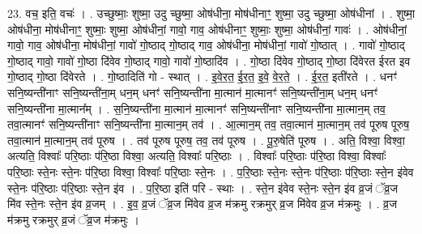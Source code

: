 \documentclass[17pt]{extarticle}
\begin{document}
23. वच॒ इति॒ वचः॑ । . उच्छुष्माः॒ शुष्मा॒ उदु च्छुष्मा॒ ओष॑धीना॒ मोष॑धीनाꣳ॒॒ शुष्मा॒ उदु च्छुष्मा॒ ओष॑धीनां । . शुष्मा॒ ओष॑धीना॒ मोष॑धीनाꣳ॒॒ शुष्माः॒ शुष्मा॒ ओष॑धीनां॒ गावो॒ गाव॒ ओष॑धीनाꣳ॒॒ शुष्माः॒ शुष्मा॒ ओष॑धीनां॒ गावः॑ । . ओष॑धीनां॒ गावो॒ गाव॒ ओष॑धीना॒ मोष॑धीनां॒ गावो॑ गो॒ष्ठाद् गो॒ष्ठाद् गाव॒ ओष॑धीना॒ मोष॑धीनां॒ गावो॑ गो॒ष्ठात् । . गावो॑ गो॒ष्ठाद् गो॒ष्ठाद् गावो॒ गावो॑ गो॒ष्ठा दि॑वेव गो॒ष्ठाद् गावो॒ गावो॑ गो॒ष्ठादि॑व । . गो॒ष्ठा दि॑वेव गो॒ष्ठाद् गो॒ष्ठा दि॑वेरत ईरत इव गो॒ष्ठाद् गो॒ष्ठा दि॑वेरते । . गो॒ष्ठादिति॑ गो - स्थात् । . इ॒वे॒र॒त॒ ई॒र॒त॒ इ॒वे॒ वे॒र॒ते॒ । . ई॒र॒त॒ इती॑रते । . धनꣳ॑ सनि॒ष्यन्ती॑नाꣳ सनि॒ष्यन्ती॑ना॒म् धन॒म् धनꣳ॑ सनि॒ष्यन्ती॑ना मा॒त्मान॑ मा॒त्मानꣳ॑ सनि॒ष्यन्ती॑ना॒म् धन॒म् धनꣳ॑ सनि॒ष्यन्ती॑ना मा॒त्मान᳚म् । . स॒नि॒ष्यन्ती॑ना मा॒त्मान॑ मा॒त्मानꣳ॑ सनि॒ष्यन्ती॑नाꣳ सनि॒ष्यन्ती॑ना मा॒त्मान॒म् तव॒ तवा॒त्मानꣳ॑ सनि॒ष्यन्ती॑नाꣳ सनि॒ष्यन्ती॑ना मा॒त्मान॒म् तव॑ । . आ॒त्मान॒म् तव॒ तवा॒त्मान॑ मा॒त्मान॒म् तव॑ पूरुष पूरुष॒ तवा॒त्मान॑ मा॒त्मान॒म् तव॑ पूरुष । . तव॑ पूरुष पूरुष॒ तव॒ तव॑ पूरुष । . पू॒रु॒षेति॑ पूरुष । . अति॒ विश्वा॒ विश्वा॒ अत्यति॒ विश्वाः᳚ परि॒ष्ठाः प॑रि॒ष्ठा विश्वा॒ अत्यति॒ विश्वाः᳚ परि॒ष्ठाः । . विश्वाः᳚ परि॒ष्ठाः प॑रि॒ष्ठा विश्वा॒ विश्वाः᳚ परि॒ष्ठाः स्ते॒नः स्ते॒नः प॑रि॒ष्ठा विश्वा॒ विश्वाः᳚ परि॒ष्ठाः स्ते॒नः । . प॒रि॒ष्ठाः स्ते॒नः स्ते॒नः प॑रि॒ष्ठाः प॑रि॒ष्ठाः स्ते॒न इ॑वेव स्ते॒नः प॑रि॒ष्ठाः प॑रि॒ष्ठाः स्ते॒न इ॑व । . प॒रि॒ष्ठा इति॑ परि - स्थाः । . स्ते॒न इ॑वेव स्ते॒नः स्ते॒न इ॑व व्र॒जं ॅव्र॒ज मि॑व स्ते॒नः स्ते॒न इ॑व व्र॒जम् । . इ॒व॒ व्र॒जं ॅव्र॒ज मि॑वेव व्र॒ज म॑क्रमु रक्रमुर् व्र॒ज मि॑वेव व्र॒ज म॑क्रमुः । . व्र॒ज म॑क्रमु रक्रमुर् व्र॒जं ॅव्र॒ज म॑क्रमुः । \newline
\end{document}

